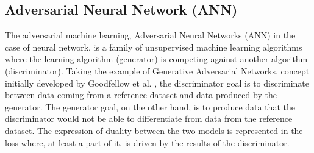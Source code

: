 \subsection{Adversarial Neural Network (ANN)}

The adversarial machine learning, Adversarial Neural Networks (ANN) in the case of neural network, is a family of unsupervised machine learning algorithms where the learning algorithm (generator) is competing against another algorithm (discriminator). Taking the example of Generative Adversarial Networks, concept initially developed by Goodfellow et al. \cite{goodfellow_generative_2014}, the discriminator goal is to discriminate between data coming from a reference dataset and data produced by the generator.
The generator goal, on the other hand, is to produce data that the discriminator would not be able to differentiate from data from the reference dataset. The expression of duality between the two models is represented in the loss where, at least a part of it, is driven by the results of the discriminator.


